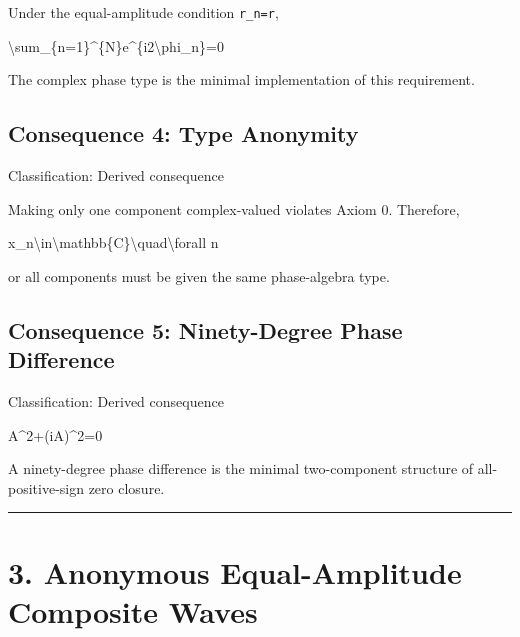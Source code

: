 \documentclass[
  a4paper]{article}
\newenvironment{Shaded}{}{}
\newcommand{\NormalTok}[1]{#1}
\begin{document}
Under the equal-amplitude condition \texttt{r\_n=r},

\begin{Shaded}
\begin{Highlighting}[]
\NormalTok{\textbackslash{}sum\_\{n=1\}\^{}\{N\}e\^{}\{i2\textbackslash{}phi\_n\}=0}
\end{Highlighting}
\end{Shaded}

The complex phase type is the minimal implementation of this
requirement.

\subsection{Consequence 4: Type
Anonymity}\label{consequence-4-type-anonymity}

Classification: Derived consequence

Making only one component complex-valued violates Axiom 0. Therefore,

\begin{Shaded}
\begin{Highlighting}[]
\NormalTok{x\_n\textbackslash{}in\textbackslash{}mathbb\{C\}\textbackslash{}quad\textbackslash{}forall n}
\end{Highlighting}
\end{Shaded}

or all components must be given the same phase-algebra type.

\subsection{Consequence 5: Ninety-Degree Phase
Difference}\label{consequence-5-ninety-degree-phase-difference}

Classification: Derived consequence

\begin{Shaded}
\begin{Highlighting}[]
\NormalTok{A\^{}2+(iA)\^{}2=0}
\end{Highlighting}
\end{Shaded}

A ninety-degree phase difference is the minimal two-component structure
of all-positive-sign zero closure.

\begin{center}\rule{0.5\linewidth}{0.5pt}\end{center}

\section{3. Anonymous Equal-Amplitude Composite
Waves}\label{anonymous-equal-amplitude-composite-waves}
\end{document}
